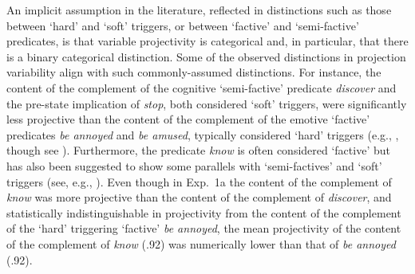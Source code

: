 \documentclass[11pt,fleqn]{article}
\newcommand{\6}{\mbox{$[\hspace*{-.6mm}[$}}
\newcommand{\9}{\mbox{$]\hspace*{-.6mm}]$}}
\begin{document}
An implicit assumption in the literature, reflected in distinctions such as those between `hard' and `soft' triggers, or between `factive' and `semi-factive' predicates, is that variable projectivity is categorical and, in particular, that there is a binary categorical distinction. Some of the observed distinctions in projection variability align with such commonly-assumed distinctions. For instance, the content of the complement of the cognitive `semi-factive' predicate {\em discover} and the pre-state implication of {\em stop}, both considered `soft' triggers, were significantly less projective than the content of the complement of the emotive `factive' predicates {\em be annoyed} and {\em be amused}, typically considered `hard' triggers (e.g., \citealt{abusch10}, though see \citealt{abrusan2011,abrusan2016}). Furthermore, the predicate {\em know} is often considered `factive' but has also been suggested to show some parallels with `semi-factives' and `soft' triggers (see, e.g., \citealt{kiparsky-kiparsky71,levinson83,simons01,chemla09b,beaver-geurts-sep}). Even though in Exp.~1a the content of the complement of {\em know} was more projective than the content of the complement of {\em discover}, and statistically indistinguishable in projectivity from the content of the complement of the `hard' triggering `factive' {\em be annoyed}, the mean projectivity of the content of the complement of {\em know} (.92) was numerically lower than that of {\em be annoyed} (.92).
\end{document}
